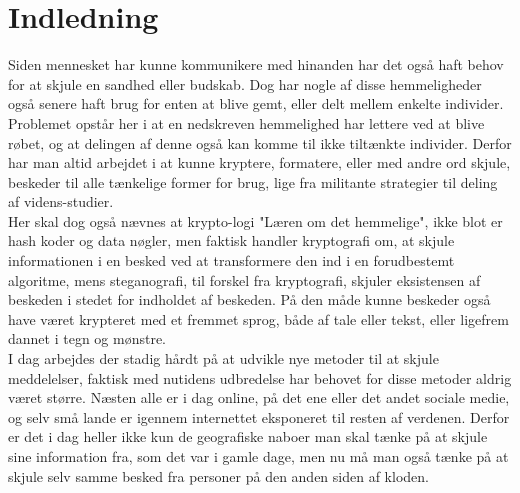 \section{Indledning}
Siden mennesket har kunne kommunikere med hinanden har det også haft behov for at skjule en sandhed eller budskab. Dog har nogle af disse hemmeligheder også senere haft brug for enten at blive gemt, eller delt mellem enkelte individer. Problemet opstår her i at en nedskreven hemmelighed har lettere ved at blive røbet, og at delingen af denne også kan komme til ikke tiltænkte individer.
Derfor har man altid arbejdet i at kunne kryptere, formatere, eller med andre ord skjule, beskeder til alle tænkelige former for brug, lige fra militante strategier til deling af videns-studier. \\
Her skal dog også nævnes at krypto-logi "Læren om det hemmelige", ikke blot er hash koder og data nøgler, men faktisk handler kryptografi om, at skjule informationen i en besked ved at transformere den ind i en forudbestemt algoritme, mens steganografi, til forskel fra kryptografi, skjuler eksistensen af beskeden i stedet for indholdet af beskeden. På den måde kunne beskeder også have været krypteret med et fremmet sprog, både af tale eller tekst, eller ligefrem dannet i tegn og mønstre.\cite{MeningOfCryptography}\\
\noindent
I dag arbejdes der stadig hårdt på at udvikle nye metoder til at skjule meddelelser, faktisk med nutidens udbredelse har behovet for disse metoder aldrig været større. Næsten alle er i dag online, på det ene eller det andet sociale medie, og selv små lande er igennem internettet eksponeret til resten af verdenen. Derfor er det i dag heller ikke kun de geografiske naboer man skal tænke på at skjule sine information fra, som det var i gamle dage, men nu må man også tænke på at skjule selv samme besked fra personer på den anden siden af kloden.

